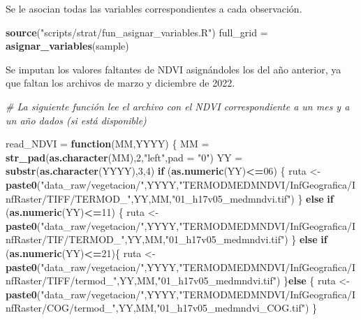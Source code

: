 \documentclass[12pt,a4paper,]{book}
\newenvironment{Shaded}{\begin{snugshade}}{\end{snugshade}}
\newcommand{\AttributeTok}[1]{\textcolor[rgb]{0.13,0.29,0.53}{#1}}
\newcommand{\CommentTok}[1]{\textcolor[rgb]{0.56,0.35,0.01}{\textit{#1}}}
\newcommand{\ControlFlowTok}[1]{\textcolor[rgb]{0.13,0.29,0.53}{\textbf{#1}}}
\newcommand{\DecValTok}[1]{\textcolor[rgb]{0.00,0.00,0.81}{#1}}
\newcommand{\FunctionTok}[1]{\textcolor[rgb]{0.13,0.29,0.53}{\textbf{#1}}}
\newcommand{\NormalTok}[1]{#1}
\newcommand{\OtherTok}[1]{\textcolor[rgb]{0.56,0.35,0.01}{#1}}
\newcommand{\SpecialCharTok}[1]{\textcolor[rgb]{0.81,0.36,0.00}{\textbf{#1}}}
\newcommand{\StringTok}[1]{\textcolor[rgb]{0.31,0.60,0.02}{#1}}
\numberwithin{dummy}{section}
\theoremstyle{ocrenumbox}
\theoremstyle{blacknumex}
\theoremstyle{blacknumbox}
\theoremstyle{ocrenum}
\theoremstyle{ocrenum}
\begin{document}
Se le asocian todas las variables correspondientes a cada observación.

\begin{Shaded}
\begin{Highlighting}[]
\FunctionTok{source}\NormalTok{(}\StringTok{"scripts/strat/fun\_asignar\_variables.R"}\NormalTok{)}
\NormalTok{full\_grid  }\OtherTok{=} \FunctionTok{asignar\_variables}\NormalTok{(sample)}
\end{Highlighting}
\end{Shaded}

Se imputan los valores faltantes de NDVI asignándoles los del año
anterior, ya que faltan los archivos de marzo y diciembre de 2022.

\begin{Shaded}
\begin{Highlighting}[]
\CommentTok{\# La siguiente función lee el archivo con el NDVI correspondiente a un mes y a un año dados (si está disponible)}

\NormalTok{read\_NDVI }\OtherTok{=} \ControlFlowTok{function}\NormalTok{(MM,YYYY) \{}
\NormalTok{  MM }\OtherTok{=} \FunctionTok{str\_pad}\NormalTok{(}\FunctionTok{as.character}\NormalTok{(MM),}\DecValTok{2}\NormalTok{,}\StringTok{"left"}\NormalTok{,}\AttributeTok{pad =} \StringTok{"0"}\NormalTok{)}
\NormalTok{  YY }\OtherTok{=} \FunctionTok{substr}\NormalTok{(}\FunctionTok{as.character}\NormalTok{(YYYY),}\DecValTok{3}\NormalTok{,}\DecValTok{4}\NormalTok{)}
  \ControlFlowTok{if}\NormalTok{ (}\FunctionTok{as.numeric}\NormalTok{(YY)}\SpecialCharTok{\textless{}=}\DecValTok{06}\NormalTok{) \{}
\NormalTok{    ruta }\OtherTok{\textless{}{-}} \FunctionTok{paste0}\NormalTok{(}\StringTok{"data\_raw/vegetacion/"}\NormalTok{,YYYY,}\StringTok{"TERMODMEDMNDVI/InfGeografica/InfRaster/TIFF/TERMOD\_"}\NormalTok{,YY,MM,}\StringTok{"01\_h17v05\_medmndvi.tif"}\NormalTok{)}
\NormalTok{  \} }\ControlFlowTok{else} \ControlFlowTok{if}\NormalTok{ (}\FunctionTok{as.numeric}\NormalTok{(YY)}\SpecialCharTok{\textless{}=}\DecValTok{11}\NormalTok{) \{}
\NormalTok{    ruta }\OtherTok{\textless{}{-}} \FunctionTok{paste0}\NormalTok{(}\StringTok{"data\_raw/vegetacion/"}\NormalTok{,YYYY,}\StringTok{"TERMODMEDMNDVI/InfGeografica/InfRaster/TIF/TERMOD\_"}\NormalTok{,YY,MM,}\StringTok{"01\_h17v05\_medmndvi.tif"}\NormalTok{)}
\NormalTok{  \} }\ControlFlowTok{else} \ControlFlowTok{if}\NormalTok{ (}\FunctionTok{as.numeric}\NormalTok{(YY)}\SpecialCharTok{\textless{}=}\DecValTok{21}\NormalTok{)\{}
\NormalTok{    ruta }\OtherTok{\textless{}{-}} \FunctionTok{paste0}\NormalTok{(}\StringTok{"data\_raw/vegetacion/"}\NormalTok{,YYYY,}\StringTok{"TERMODMEDMNDVI/InfGeografica/InfRaster/TIFF/termod\_"}\NormalTok{,YY,MM,}\StringTok{"01\_h17v05\_medmndvi.tif"}\NormalTok{)}
\NormalTok{  \}}\ControlFlowTok{else}\NormalTok{ \{}
\NormalTok{    ruta }\OtherTok{\textless{}{-}} \FunctionTok{paste0}\NormalTok{(}\StringTok{"data\_raw/vegetacion/"}\NormalTok{,YYYY,}\StringTok{"TERMODMEDMNDVI/InfGeografica/InfRaster/COG/termod\_"}\NormalTok{,YY,MM,}\StringTok{"01\_h17v05\_medmndvi\_COG.tif"}\NormalTok{)}
\NormalTok{  \}}


\end{Highlighting}
\end{Shaded}
\end{document}
